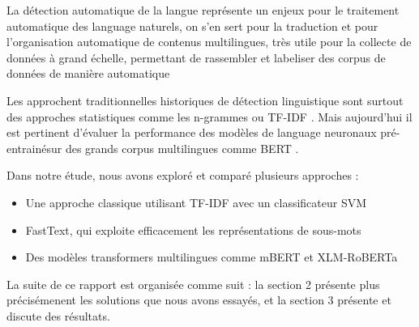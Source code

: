 
La détection automatique de la langue représente un enjeux pour le traitement automatique des language naturels, on s'en sert pour la traduction et pour l'organisation automatique de contenus multilingues, très utile pour la collecte de données à grand échelle, permettant de rassembler et labeliser des corpus de données de manière automatique

Les approchent traditionnelles historiques de détection linguistique sont surtout des approches statistiques comme les n-grammes \cite{cavnar1994n} ou TF-IDF \cite{baldwin2010language}. Mais aujourd'hui il est pertinent d'évaluer la performance des modèles de language neuronaux pré-entrainésur des grands corpus multilingues comme BERT \cite{devlin2019bert}.

Dans notre étude, nous avons exploré et comparé plusieurs approches :
\begin{itemize}
    \item Une approche classique utilisant TF-IDF avec un classificateur SVM
    \item FastText, qui exploite efficacement les représentations de sous-mots \cite{joulin2017bag}
    \item Des modèles transformers multilingues comme mBERT \cite{devlin2019bert} et XLM-RoBERTa \cite{conneau2020unsupervised}
\end{itemize}

La suite de ce rapport est organisée comme suit : la section 2 présente plus précisémenent les solutions que nous avons essayés, et la section 3 présente et discute des résultats.

